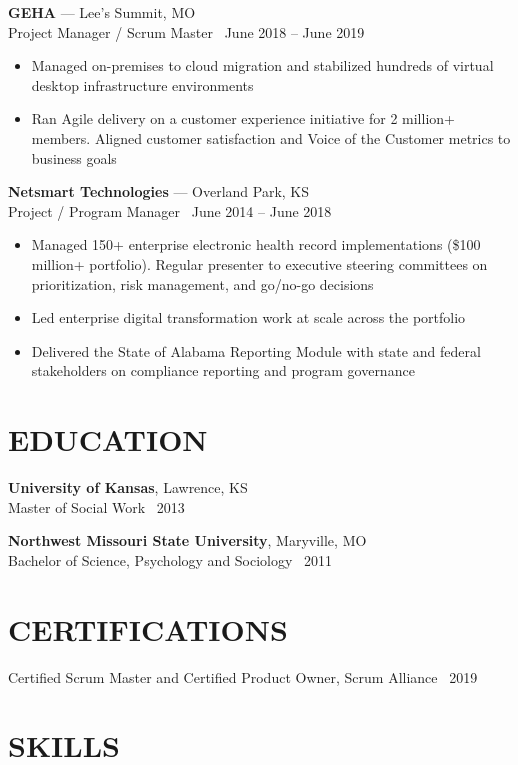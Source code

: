 \documentclass[10pt]{article}
\newcommand{\roleheader}[4]{%
  \noindent\textbf{#1} --- #2\\
  #3 \textperiodcentered\ #4\par\vspace{0.04in}
}
\begin{document}
\roleheader{GEHA}{Lee's Summit, MO}{Project Manager / Scrum Master}{June 2018 -- June 2019}
\begin{itemize}
  \item Managed on-premises to cloud migration and stabilized hundreds of virtual desktop infrastructure environments
  \item Ran Agile delivery on a customer experience initiative for 2 million+ members. Aligned customer satisfaction and Voice of the Customer metrics to business goals
\end{itemize}

\roleheader{Netsmart Technologies}{Overland Park, KS}{Project / Program Manager}{June 2014 -- June 2018}
\begin{itemize}
  \item Managed 150+ enterprise electronic health record implementations (\$100 million+ portfolio). Regular presenter to executive steering committees on prioritization, risk management, and go/no-go decisions
  \item Led enterprise digital transformation work at scale across the portfolio
  \item Delivered the State of Alabama Reporting Module with state and federal stakeholders on compliance reporting and program governance
\end{itemize}

\section*{EDUCATION}

\noindent\textbf{University of Kansas}, Lawrence, KS\\
Master of Social Work \textperiodcentered\ 2013

\vspace{0.06in}
\noindent\textbf{Northwest Missouri State University}, Maryville, MO\\
Bachelor of Science, Psychology and Sociology \textperiodcentered\ 2011

\section*{CERTIFICATIONS}

\noindent Certified Scrum Master and Certified Product Owner, Scrum Alliance \textperiodcentered\ 2019

\section*{SKILLS}
\end{document}

